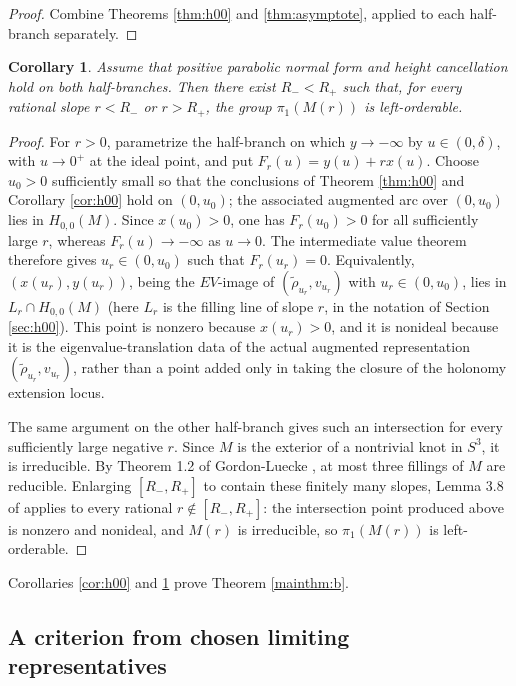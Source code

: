 \documentclass{article}
\theoremstyle{plain}
\theoremstyle{definition}
\theoremstyle{plain}
\theoremstyle{plain}
\newtheorem{corollary}[theorem]{Corollary}
\theoremstyle{plain}
\theoremstyle{remark}
\theoremstyle{remark}
\theoremstyle{plain}
\theoremstyle{plain}
\newcounter{main}
\theoremstyle{plain}
\theoremstyle{plain}
\begin{document}
\begin{proof}
Combine Theorems \ref{thm:h00} and \ref{thm:asymptote}, applied to each half-branch separately. 
\end{proof}

\begin{corollary}\label{cor:slopes}
Assume that positive parabolic normal form and height cancellation hold on both half-branches. Then there exist $R_-<R_+$ such that, for every rational slope $r<R_-$ or $r>R_+$, the group $\pi_1(M(r))$ is left-orderable.
\end{corollary}

\begin{proof}
For $r>0$, parametrize the half-branch on which $y\to-\infty$ by $u\in(0,\delta)$, with $u\to0^+$ at the ideal point, and put $F_r(u)=y(u)+rx(u)$. Choose $u_0>0$ sufficiently small so that the conclusions of Theorem \ref{thm:h00} and Corollary \ref{cor:h00} hold on $(0, u_0)$; the associated augmented arc over $(0, u_0)$ lies in $H_{0,0}(M)$. Since $x(u_0)>0$, one has $F_r(u_0)>0$ for all sufficiently large $r$, whereas $F_r(u)\longrightarrow-\infty$ as $u\to0$. The intermediate value theorem therefore gives $u_r\in(0,u_0)$ such that $F_r(u_r)=0$. Equivalently, $(x(u_r),y(u_r))$, being the $EV$-image of $(\widetilde\rho_{u_r}, v_{u_r})$ with $u_r \in (0, u_0)$, lies in $L_r\cap H_{0,0}(M)$ (here $L_r$ is the filling line of slope $r$, in the notation of Section \ref{sec:h00}). This point is nonzero because $x(u_r)>0$, and it is nonideal because it is the eigenvalue-translation data of the actual augmented representation $(\widetilde\rho_{u_r},v_{u_r})$, rather than a point added only in taking the closure of the holonomy extension locus.

\medskip
	
The same argument on the other half-branch gives such an intersection for every sufficiently large negative $r$. Since $M$ is the exterior of a nontrivial knot in $S^3$, it is irreducible. By Theorem 1.2 of Gordon-Luecke \cite{gordonleucke}, at most three fillings of $M$ are reducible. Enlarging $[R_-,R_+]$ to contain these finitely many slopes, Lemma 3.8 of \cite{gao} applies to every rational $r \notin [R_-, R_+]$: the intersection point produced above is nonzero and nonideal, and $M(r)$ is irreducible, so $\pi_1(M(r))$ is left-orderable. 
\end{proof}

Corollaries \ref{cor:h00} and \ref{cor:slopes} prove Theorem \ref{mainthm:b}. 

\subsection{A criterion from chosen limiting representatives}
\end{document}
